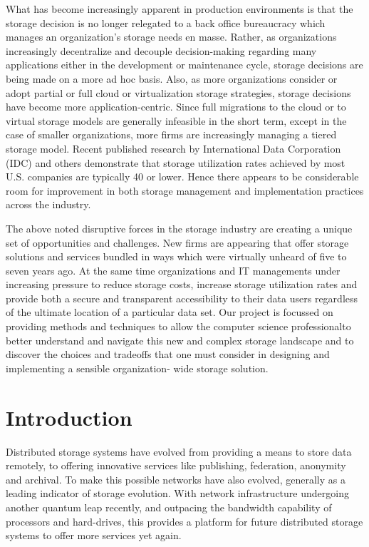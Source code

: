 \documentclass[11pt]{article}
\begin{document}
What has become increasingly apparent in production environments is that the 
storage decision is no longer relegated to a back office bureaucracy which 
manages an organization’s storage needs en masse. Rather, as organizations 
increasingly decentralize and decouple decision-making regarding many applications 
either in the development or maintenance cycle, storage decisions are being made 
on a more ad hoc basis. Also, as more organizations consider or adopt partial or 
full cloud or virtualization storage strategies, storage decisions have become 
more application-centric. Since full migrations to the cloud or to virtual storage 
models are generally infeasible in the short term, except in the case of smaller 
organizations, more firms are increasingly managing a tiered storage model. Recent 
published research by International Data Corporation (IDC) and others demonstrate 
that storage utilization rates achieved by most U.S. companies are typically 40%
or lower. Hence there appears to be considerable room for improvement in both 
storage management and implementation practices across the industry. 

The above noted disruptive forces in the storage industry are creating a unique 
set of opportunities and challenges. New firms are appearing that offer storage 
solutions and services bundled in ways which were virtually unheard of five to 
seven years ago. At the same time organizations and IT managements under increasing 
pressure to reduce storage costs, increase storage utilization rates and provide 
both a secure and transparent accessibility to their data users regardless of 
the ultimate location of a particular data set. Our project is focussed on providing 
methods and techniques to allow the computer science professionalto better understand 
and navigate this new and complex storage landscape and to discover the choices and 
tradeoffs that one must consider in designing and implementing a sensible organization-
wide storage solution.

\section{Introduction}
Distributed storage systems have evolved from providing a means to store data 
remotely, to offering innovative services like publishing, federation, anonymity 
and archival. To make this possible networks have also evolved, generally as a leading 
indicator of storage evolution. With network infrastructure undergoing another quantum 
leap recently, and outpacing the bandwidth capability of processors and hard-drives, 
this provides a platform for future distributed storage systems to offer more services 
yet again. 
\end{document}
